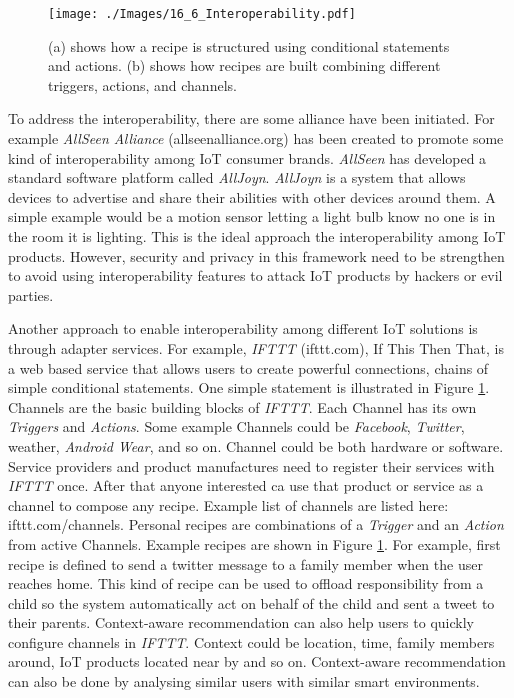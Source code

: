 \documentclass[journal]{IEEEtran}
\begin{document}
     \begin{figure}[!t]
      \centering
\texttt{[image: ./Images/16\_6\_Interoperability.pdf]}
\caption{(a) shows how a recipe is structured using conditional statements and actions. (b) shows how recipes are built combining different triggers, actions, and channels.}
      \label{Figure:Interoperability}	
\end{figure}


To address the interoperability, there are some alliance have been initiated. For example \textit{AllSeen Alliance} (allseenalliance.org) has been created to promote some kind of interoperability among IoT consumer brands. \textit{AllSeen} has developed a standard software platform called \textit{AllJoyn}. \textit{AllJoyn} is a system that allows devices to advertise and share their abilities with other devices around them. A simple example would be a motion sensor letting a light bulb know no one is in the room it is lighting. This is the ideal approach the interoperability among IoT products. However, security \cite{IA03} and privacy in this framework need to be strengthen to avoid using interoperability features to attack IoT products by hackers or evil parties.

Another approach to enable interoperability among different IoT solutions is through adapter services. For example, \textit{IFTTT} (ifttt.com), If This Then That, is a web based service that allows users to create powerful connections, chains of simple conditional statements. One simple statement is illustrated in Figure \ref{Figure:Interoperability}. Channels are the basic building blocks of \textit{IFTTT}. Each Channel has its own \textit{Triggers} and \textit{Actions}. Some example Channels could be \textit{Facebook}, \textit{Twitter}, weather,\textit{ Android Wear}, and so on. Channel could be both hardware or software. Service providers and product manufactures need to register their services with \textit{IFTTT} once. After that anyone interested ca  use that product or service as a channel to compose any recipe. Example list of channels are listed here: ifttt.com/channels.  Personal recipes are combinations of a \textit{Trigger} and an \textit{Action} from  active Channels. Example recipes are shown in Figure \ref{Figure:Interoperability}. For example, first recipe is defined to send a twitter message to a family member when the user reaches home. This kind of recipe can be used to offload responsibility from a child so the system automatically act on behalf of the child and sent a tweet to their parents. Context-aware recommendation can also help users to quickly configure channels in \textit{IFTTT}. Context could be location, time, family members around, IoT products located near by and so on. Context-aware recommendation \cite{IA003} can also be done by analysing similar users with similar smart environments.
\end{document}
